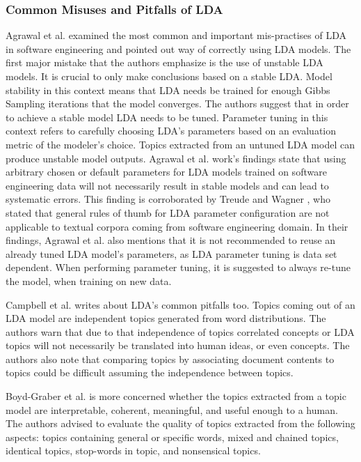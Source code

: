         \subsubsection{Common Misuses and Pitfalls of LDA}
            Agrawal et al. \cite{agrawal2018wrong} examined the most common and important mis-practises of LDA in software engineering and pointed out way of correctly using LDA models. The first major mistake that the authors emphasize is the use of unstable LDA models. It is crucial to only make conclusions based on a stable LDA. Model stability in this context means that LDA needs be trained for enough Gibbs Sampling iterations that the model converges. The authors suggest that in order to achieve a stable model LDA needs to be tuned. Parameter tuning in this context refers to carefully choosing LDA's parameters based on an evaluation metric of the modeler's choice. Topics extracted from an untuned LDA model can produce unstable model outputs. Agrawal et al. \cite{agrawal2018wrong} work's findings state that using arbitrary chosen or default parameters for LDA models trained on software engineering data will not necessarily result in stable models and can lead to systematic errors. This finding is corroborated by Treude and Wagner \cite{treude2019predicting}, who stated that general rules of thumb for LDA parameter configuration are not applicable to textual corpora coming from software engineering domain. In their findings, Agrawal et al. \cite{agrawal2018wrong} also mentions that it is not recommended to reuse an already tuned LDA model's parameters, as LDA parameter tuning is data set dependent. When performing parameter tuning, it is suggested to always re-tune the model, when training on new data.
            
            Campbell et al. \cite{campbell2015latent} writes about LDA's common pitfalls too. Topics coming out of an LDA model are independent topics generated from word distributions. The authors warn that due to that independence of topics correlated concepts or LDA topics will not  necessarily be translated into human ideas, or even concepts. The authors also note that comparing topics by associating document contents to topics could be difficult assuming the independence between topics.
            
            Boyd-Graber et al. \cite{boyd2014care} is more concerned whether the topics extracted from a topic model are interpretable, coherent, meaningful, and useful enough to a human. The authors advised to evaluate the quality of topics extracted from the following aspects: topics containing general or specific words, mixed and chained topics, identical topics, stop-words in topic, and nonsensical topics.
            
